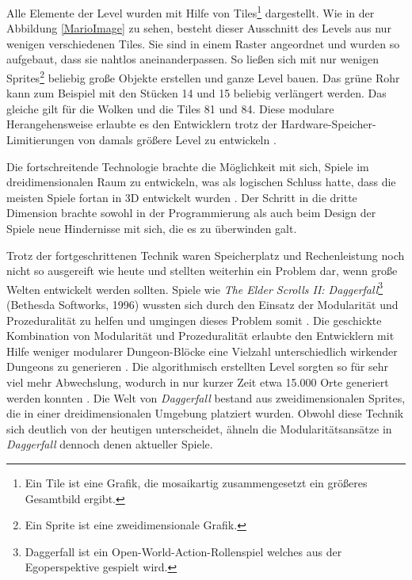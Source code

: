 \vspace{-10.5pt}
\par
Alle Elemente der Level wurden mit Hilfe von Tiles\footnote{Ein Tile ist eine Grafik, die mosaikartig zusammengesetzt ein größeres Gesamtbild ergibt.} dargestellt. Wie in der Abbildung \ref{MarioImage} zu sehen, besteht dieser Ausschnitt des Levels aus nur wenigen verschiedenen Tiles. Sie sind in einem Raster angeordnet und wurden so aufgebaut, dass sie nahtlos aneinanderpassen. So ließen sich mit nur wenigen Sprites\footnote{Ein Sprite ist eine zweidimensionale Grafik.} beliebig große Objekte erstellen und ganze Level bauen. Das grüne Rohr kann zum Beispiel mit den Stücken 14 und 15 beliebig verlängert werden. Das gleiche gilt für die Wolken und die Tiles 81 und 84. Diese modulare Herangehensweise erlaubte es den Entwicklern trotz der Hardware-Speicher-Limitierungen von damals größere Level zu entwickeln \parencite{Mario}.
\par
Die fortschreitende Technologie brachte die Möglichkeit mit sich, Spiele im dreidimensionalen Raum zu entwickeln, was als logischen Schluss hatte, dass die meisten Spiele fortan in 3D entwickelt wurden \parencite{GameHistory}. Der Schritt in die dritte Dimension brachte sowohl in der Programmierung als auch beim Design der Spiele neue Hindernisse mit sich, die es zu überwinden galt.
\par
Trotz der fortgeschrittenen Technik waren Speicherplatz und Rechenleistung noch nicht so ausgereift wie heute und stellten weiterhin ein Problem dar, wenn große Welten entwickelt werden sollten. Spiele wie \textit{The Elder Scrolls II: Daggerfall}\footnote{Daggerfall ist ein Open-World-Action-Rollenspiel welches aus der Egoperspektive gespielt wird.} (Bethesda Softworks, 1996) wussten sich durch den Einsatz der Modularität und Prozeduralität zu helfen und umgingen dieses Problem somit \parencite{Fallout4}. Die geschickte Kombination von Modularität und Prozeduralität erlaubte den Entwicklern mit Hilfe weniger modularer Dungeon-Blöcke eine Vielzahl unterschiedlich wirkender Dungeons zu generieren \parencite{Fallout4}. Die algorithmisch erstellten Level sorgten so für sehr viel mehr Abwechslung, wodurch in nur kurzer Zeit etwa 15.000 Orte generiert werden konnten \parencite{Daggerfall}. Die Welt von \textit{Daggerfall} bestand aus zweidimensionalen Sprites, die in einer dreidimensionalen Umgebung platziert wurden. Obwohl diese Technik sich deutlich von der heutigen unterscheidet, ähneln die Modularitätsansätze in \textit{Daggerfall} dennoch denen aktueller Spiele.
